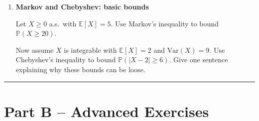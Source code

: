 \documentclass[11pt]{article}
\begin{document}
\begin{enumerate}[leftmargin=*, itemsep=1.2em]
\bigskip

\item \textbf{Markov and Chebyshev: basic bounds}

Let $X\ge0$ a.s.\ with $\mathbb{E}[X]=5$.
Use Markov's inequality to bound $\mathbb{P}(X\ge 20)$.

Now assume $X$ is integrable with $\mathbb{E}[X]=2$ and $\mathrm{Var}(X)=9$.
Use Chebyshev's inequality to bound $\mathbb{P}(|X-2|\ge 6)$.
Give one sentence explaining why these bounds can be loose.

\end{enumerate}

\bigskip
\hrule
\bigskip

\section*{Part B -- Advanced Exercises}
\end{document}

